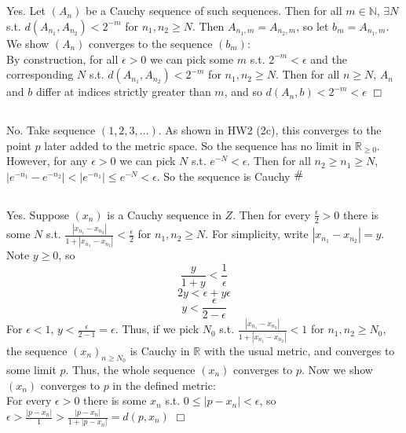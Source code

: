 \documentclass{article}
\newcommand{\contra}{\raisebox{\depth}{\#}}
\begin{document}
\subsection{}
Yes. Let $(A_n)$ be a Cauchy sequence of such sequences. Then for all $m \in \mathbb{N}$, $\exists N$ s.t. $d(A_{n_1},A_{n_2}) < 2^{-m}$ for $n_1,n_2 \geq N$. Then $A_{n_1,m} = A_{n_2,m}$, so let $b_m = A_{n_1,m}$. We show $(A_n)$ converges to the sequence $(b_m)$:\\
By construction, for all $\epsilon > 0$ we can pick some $m$ s.t. $2^{-m} < \epsilon$ and the corresponding $N$ s.t. $d(A_{n_1},A_{n_2}) < 2^{-m}$ for $n_1,n_2 \geq N$. Then for all $n\geq N$, $A_n$ and $b$ differ at indices strictly greater than $m$, and so $d(A_n,b) < 2^{-m} < \epsilon$ $\Box$

\subsection{}
No. Take sequence $(1,2,3,\dots)$. As shown in HW2 (2c), this converges to the point $p$ later added to the metric space. So the sequence has no limit in $\mathbb{R}_{\geq 0}$. However, for any $\epsilon > 0$ we can pick $N$ s.t. $e^{-N}<\epsilon$. Then for all $n_2\geq n_1\geq N$, $|e^{-n_1} - e^{-n_2}| < |e^{-n_1}| \leq e^{-N} < \epsilon$. So the sequence is Cauchy $\contra$

\subsection{}
Yes. Suppose $(x_n)$ is a Cauchy sequence in $Z$. Then for every $\frac{\epsilon}{2} > 0$ there is some $N$ s.t. $\frac{|x_{n_1} - x_{n_2}|}{1 + |x_{n_1}-x_{n_2}|} < \frac{\epsilon}{2}$ for $n_1,n_2 \geq N$. For simplicity, write $|x_{n_1}-x_{n_2}| = y$.\\
Note $y\geq 0$, so
$$\frac{y}{1+y} < \frac{1}{\epsilon}$$
$$2y < \epsilon + y\epsilon$$
$$y < \frac{\epsilon}{2-\epsilon}$$
For $\epsilon < 1$, $y < \frac{\epsilon}{2-1} = \epsilon$. Thus, if we pick $N_0$ s.t. $\frac{|x_{n_1} - x_{n_2}|}{1 + |x_{n_1}-x_{n_2}|} < 1$ for $n_1,n_2\geq N_0$, the sequence $(x_n)_{n\geq N_0}$ is Cauchy in $\mathbb{R}$ with the usual metric, and converges to some limit $p$. Thus, the whole sequence $(x_n)$ converges to $p$. Now we show $(x_n)$ converges to $p$ in the defined metric:\\
For every $\epsilon > 0$ there is some $x_n$ s.t. $0\leq |p-x_n| < \epsilon$, so $\epsilon > \frac{|p-x_n|}{1} > \frac{|p-x_n|}{1+|p-x_n|} = d(p,x_n)$ $\Box$
\end{document}
